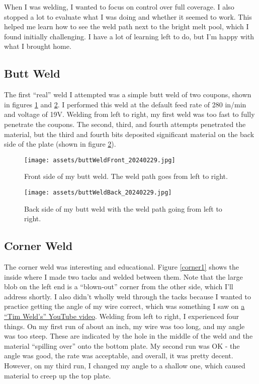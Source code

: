 \documentclass{article}
\begin{document}
When I was welding, I wanted to focus on control over full coverage. I also stopped a lot to evaluate what I was doing and whether it seemed to work. This helped me learn how to see the weld path next to the bright melt pool, which I found initially challenging. I have a lot of learning left to do, but I'm happy with what I brought home.

\subsection*{Butt Weld}

The first ``real'' weld I attempted was a simple butt weld of two coupons, shown in figures \ref{butt1} and \ref{butt2}. I performed this weld at the default feed rate of 280 in/min and voltage of 19V. Welding from left to right, my first weld was too fast to fully penetrate the coupons. The second, third, and fourth attempts penetrated the material, but the third and fourth bits deposited significant material on the back side of the plate (shown in figure \ref{butt2}).

\begin{figure}[h]
\caption{Front side of my butt weld. The weld path goes from left to right.}
\texttt{[image: assets/buttWeldFront\_20240229.jpg]}
\label{butt1}
\end{figure}

\begin{figure}[h]
\caption{Back side of my butt weld with the weld path going from left to right.}
\texttt{[image: assets/buttWeldBack\_20240229.jpg]}
\label{butt2}
\end{figure}

\subsection*{Corner Weld}

The corner weld was interesting and educational. Figure \ref{corner1} shows the inside where I made two tacks and welded between them. Note that the large blob on the left end is a ``blown-out'' corner from the other side, which I'll address shortly. I also didn't wholly weld through the tacks because I wanted to practice getting the angle of my wire correct, which was something I saw on \href{https://www.youtube.com/watch?v=kUDrP2_JJ68}{a ``Tim Weld's'' YouTube video}. Welding from left to right, I experienced four things. On my first run of about an inch, my wire was too long, and my angle was too steep. These are indicated by the hole in the middle of the weld and the material ``spilling over'' onto the bottom plate. My second run was OK - the angle was good, the rate was acceptable, and overall, it was pretty decent. However, on my third run, I changed my angle to a shallow one, which caused material to creep up the top plate.
\end{document}
